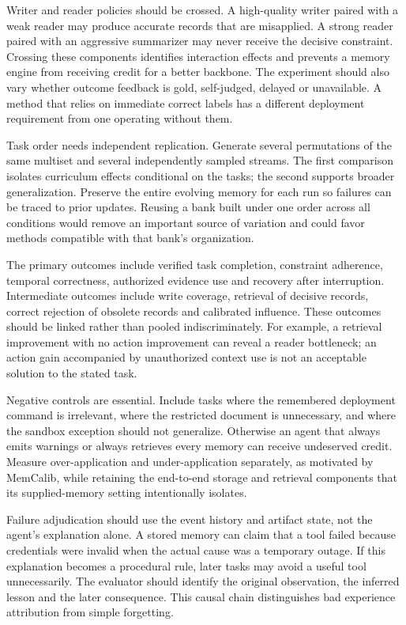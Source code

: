Writer and reader policies should be crossed. A high-quality writer paired with a weak reader may produce accurate records that are misapplied. A strong reader paired with an aggressive summarizer may never receive the decisive constraint. Crossing these components identifies interaction effects and prevents a memory engine from receiving credit for a better backbone. The experiment should also vary whether outcome feedback is gold, self-judged, delayed or unavailable. A method that relies on immediate correct labels has a different deployment requirement from one operating without them.

Task order needs independent replication. Generate several permutations of the same multiset and several independently sampled streams. The first comparison isolates curriculum effects conditional on the tasks; the second supports broader generalization. Preserve the entire evolving memory for each run so failures can be traced to prior updates. Reusing a bank built under one order across all conditions would remove an important source of variation and could favor methods compatible with that bank's organization.

The primary outcomes include verified task completion, constraint adherence, temporal correctness, authorized evidence use and recovery after interruption. Intermediate outcomes include write coverage, retrieval of decisive records, correct rejection of obsolete records and calibrated influence. These outcomes should be linked rather than pooled indiscriminately. For example, a retrieval improvement with no action improvement can reveal a reader bottleneck; an action gain accompanied by unauthorized context use is not an acceptable solution to the stated task.

Negative controls are essential. Include tasks where the remembered deployment command is irrelevant, where the restricted document is unnecessary, and where the sandbox exception should not generalize. Otherwise an agent that always emits warnings or always retrieves every memory can receive undeserved credit. Measure over-application and under-application separately, as motivated by MemCalib, while retaining the end-to-end storage and retrieval components that its supplied-memory setting intentionally isolates.

Failure adjudication should use the event history and artifact state, not the agent's explanation alone. A stored memory can claim that a tool failed because credentials were invalid when the actual cause was a temporary outage. If this explanation becomes a procedural rule, later tasks may avoid a useful tool unnecessarily. The evaluator should identify the original observation, the inferred lesson and the later consequence. This causal chain distinguishes bad experience attribution from simple forgetting.

